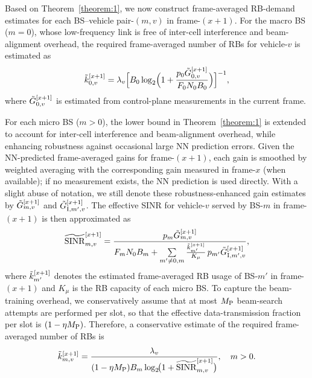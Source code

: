 \documentclass[conference, a4paper]{IEEEtran}
\theoremstyle{remark}
\begin{document}
Based on Theorem~\ref{theorem:1}, we now construct frame-averaged RB-demand estimates for each BS–vehicle pair-$(m,v)$ in frame-$(x\!+\!1)$.
For the macro BS ($m=0$), whose low-frequency link is free of inter-cell interference and beam-alignment overhead, the required frame-averaged number of RBs for vehicle-$v$ is estimated as 
\begin{equation}
\label{eq:RB_demand_hat_macro}
    \Tilde{k}_{0,v}^{[x+1]}
    = \lambda_v
      \Bigl[
        B_0 \log_2 \Bigl(
        1 + \frac{ p_0 \Tilde{G}_{0,v}^{[x+1]}}{F_0 N_0 B_0}
        \Bigr)
      \Bigr]^{-1},
\end{equation}
where $\Tilde{G}_{0,v}^{[x+1]}$ is estimated from control-plane measurements in the current frame.

For each micro BS ($m>0$), the lower bound in Theorem~\ref{theorem:1} is extended to account for inter-cell interference and beam-alignment overhead, while enhancing robustness against occasional large NN prediction errors. Given the NN-predicted frame-averaged gains for frame-$(x\!+\!1)$, each gain is smoothed by weighted averaging with the corresponding gain measured in frame-$x$ (when available); if no measurement exists, the NN prediction is used directly. With a slight abuse of notation, we still denote these robustness-enhanced gain estimates by $\Tilde{G}_{m,v}^{[x+1]}$ and $\Tilde{G}_{{\rm I},m',v}^{[x+1]}$. The effective SINR for vehicle-$v$ served by BS-$m$ in frame-$(x\!+\!1)$ is then approximated as
\begin{equation}
\label{eq:eff_SINR_hat}
    \widetilde{\mathrm{SINR}}_{m,v}^{[x+1]}
    = \frac{p_m \Tilde{G}_{m,v}^{[x+1]}}
           {F_m N_0 B_m
            + \sum\limits_{m'\neq 0,m}
              \frac{\Tilde{k}_{m'}^{[x+1]}}{K_\mu}\, p_{m'} \Tilde{G}_{{\rm I},m',v}^{[x+1]}},
\end{equation}
where $\Tilde{k}_{m'}^{[x+1]}$ denotes the estimated frame-averaged RB usage of BS-$m'$ in frame-$(x\!+\!1)$ and $K_\mu$ is the RB capacity of each micro BS. To capture the beam-training overhead, we conservatively assume that at most $M_{\rm P}$ beam-search attempts are performed per slot, so that the effective data-transmission fraction per slot is $(1-\eta M_{\rm P})$. Therefore, a conservative estimate of the required frame-averaged number of RBs is
\begin{equation}
\label{eq:RB_demand_hat}
    \Tilde{k}_{m,v}^{[x+1]}
    = \frac{\lambda_v}{(1-\eta M_{\rm P}) B_m \log_2\!\bigl(1+\widetilde{\mathrm{SINR}}_{m,v}^{[x+1]}\bigr)},
    \quad m>0.
\end{equation}
\end{document}

